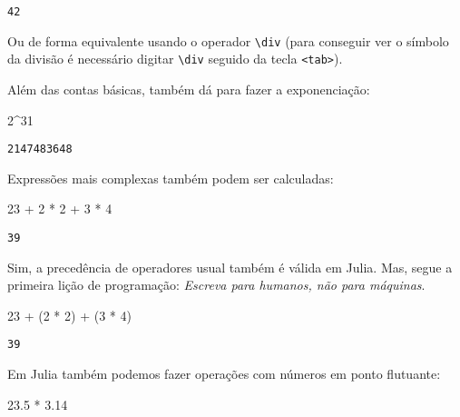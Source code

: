 \documentclass[
  letterpaper,
  DIV=11,
  numbers=noendperiod]{scrreprt}
\newenvironment{Shaded}{\begin{snugshade}}{\end{snugshade}}
\newcommand{\FloatTok}[1]{\textcolor[rgb]{0.68,0.00,0.00}{#1}}
\newcommand{\NormalTok}[1]{\textcolor[rgb]{0.00,0.23,0.31}{#1}}
\newcommand{\OperatorTok}[1]{\textcolor[rgb]{0.37,0.37,0.37}{#1}}
\begin{document}
\begin{verbatim}
42
\end{verbatim}

Ou de forma equivalente usando o operador \texttt{\textbackslash{}div}
(para conseguir ver o símbolo da divisão é necessário digitar
\texttt{\textbackslash{}div} seguido da tecla
\texttt{\textless{}tab\textgreater{}}).

Além das contas básicas, também dá para fazer a exponenciação:

\begin{Shaded}
\begin{Highlighting}[]
\FloatTok{2}\OperatorTok{\^{}}\FloatTok{31}
\end{Highlighting}
\end{Shaded}

\begin{verbatim}
2147483648
\end{verbatim}

Expressões mais complexas também podem ser calculadas:

\begin{Shaded}
\begin{Highlighting}[]
\FloatTok{23} \OperatorTok{+} \FloatTok{2} \OperatorTok{*} \FloatTok{2} \OperatorTok{+} \FloatTok{3} \OperatorTok{*} \FloatTok{4}
\end{Highlighting}
\end{Shaded}

\begin{verbatim}
39
\end{verbatim}

Sim, a precedência de operadores usual também é válida em Julia. Mas,
segue a primeira lição de programação: \emph{Escreva para humanos, não
para máquinas}.

\begin{Shaded}
\begin{Highlighting}[]
\FloatTok{23} \OperatorTok{+}\NormalTok{ (}\FloatTok{2} \OperatorTok{*} \FloatTok{2}\NormalTok{) }\OperatorTok{+}\NormalTok{ (}\FloatTok{3} \OperatorTok{*} \FloatTok{4}\NormalTok{)}
\end{Highlighting}
\end{Shaded}

\begin{verbatim}
39
\end{verbatim}

Em Julia também podemos fazer operações com números em ponto flutuante:

\begin{Shaded}
\begin{Highlighting}[]
\FloatTok{23.5} \OperatorTok{*} \FloatTok{3.14}
\end{Highlighting}
\end{Shaded}
\end{document}
